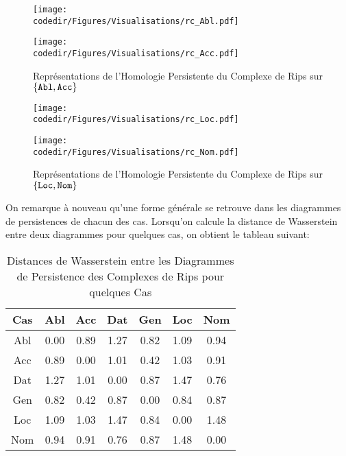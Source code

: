\documentclass{cours}
\newcommand{\codedir}{Morphosyntactic-Categories_Code}
\begin{document}
\begin{figure}[H]
    \begin{minipage}{.5\textwidth}
        \begin{center}
            \texttt{[image: \\codedir/Figures/Visualisations/rc\_Abl.pdf]}
        \end{center}
    \end{minipage}
    \begin{minipage}{.5\textwidth}
        \begin{center}
            \texttt{[image: \\codedir/Figures/Visualisations/rc\_Acc.pdf]}
        \end{center}
    \end{minipage}
    \caption{Représentations de l'Homologie Persistente du Complexe de Rips sur $\{\tt Abl,Acc\}$}
\end{figure}

\begin{figure}[H]
    \begin{minipage}{.5\textwidth}
        \begin{center}
            \texttt{[image: \\codedir/Figures/Visualisations/rc\_Loc.pdf]}
        \end{center}
    \end{minipage}
    \begin{minipage}{.5\textwidth}
        \begin{center}
            \texttt{[image: \\codedir/Figures/Visualisations/rc\_Nom.pdf]}
        \end{center}
    \end{minipage}
    \caption{Représentations de l'Homologie Persistente du Complexe de Rips sur $\{\tt Loc,Nom\}$}
\end{figure}

On remarque à nouveau qu'une forme générale se retrouve dans les diagrammes de persistences de chacun des cas.
Lorsqu'on calcule la distance de Wasserstein entre deux diagrammes pour quelques cas, on obtient le tableau suivant:
\begin{table}[H]
	\centering
	\begin{tabular}{c|cccccc}
		\toprule
		Cas & Abl & Acc & Dat & Gen & Loc & Nom\\
		\midrule
		Abl & 0.00 & 0.89 & 1.27 & 0.82 & 1.09 & 0.94\\
		Acc & 0.89 & 0.00 & 1.01 & 0.42 & 1.03 & 0.91\\
		Dat & 1.27 & 1.01 & 0.00 & 0.87 & 1.47 & 0.76\\
		Gen & 0.82 & 0.42 & 0.87 & 0.00 & 0.84 & 0.87\\
		Loc & 1.09 & 1.03 & 1.47 & 0.84 & 0.00 & 1.48\\
		Nom & 0.94 & 0.91 & 0.76 & 0.87 & 1.48 & 0.00\\
		\bottomrule
	\end{tabular}
	\caption{Distances de Wasserstein entre les Diagrammes de Persistence des Complexes de Rips pour quelques Cas}
\end{table}
\end{document}
